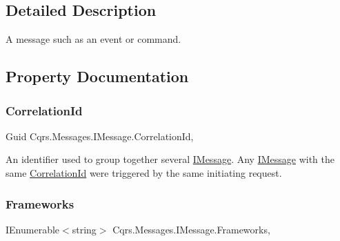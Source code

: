 \subsection{Detailed Description}
A message such as an event or command. 



\subsection{Property Documentation}
\mbox{\label{interfaceCqrs_1_1Messages_1_1IMessage_a9037d871a75ac76b190130aa56fe63a8_a9037d871a75ac76b190130aa56fe63a8}} 
\subsubsection{\texorpdfstring{Correlation\+Id}{CorrelationId}}
{\footnotesize\ttfamily Guid Cqrs.\+Messages.\+I\+Message.\+Correlation\+Id\hspace{0.3cm}{\ttfamily [get]}, {\ttfamily [set]}}



An identifier used to group together several \hyperlink{interfaceCqrs_1_1Messages_1_1IMessage}{I\+Message}. Any \hyperlink{interfaceCqrs_1_1Messages_1_1IMessage}{I\+Message} with the same \hyperlink{interfaceCqrs_1_1Messages_1_1IMessage_a9037d871a75ac76b190130aa56fe63a8_a9037d871a75ac76b190130aa56fe63a8}{Correlation\+Id} were triggered by the same initiating request. 

\mbox{\label{interfaceCqrs_1_1Messages_1_1IMessage_af147de5bb9a480ba75b5bb9f0ef12132_af147de5bb9a480ba75b5bb9f0ef12132}} 
\subsubsection{\texorpdfstring{Frameworks}{Frameworks}}
{\footnotesize\ttfamily I\+Enumerable$<$string$>$ Cqrs.\+Messages.\+I\+Message.\+Frameworks\hspace{0.3cm}{\ttfamily [get]}, {\ttfamily [set]}}



